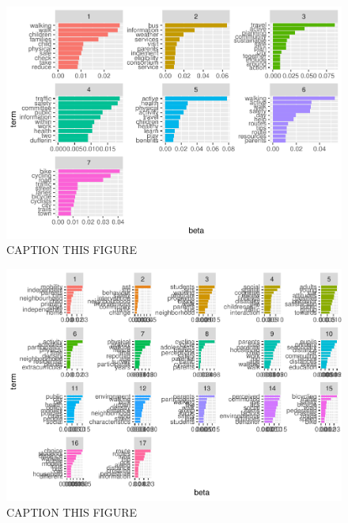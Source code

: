 \documentclass[]{elsarticle} %
\begin{document}
\begin{figure}
\includegraphics[width=1\linewidth]{AST-Framing-Ontario_files/figure-latex/policy-terms-1} \caption{\label{fig:policy-terms}CAPTION THIS FIGURE}\label{fig:policy-terms}
\end{figure}

\begin{figure}
\includegraphics[width=1\linewidth]{AST-Framing-Ontario_files/figure-latex/academic-terms-1} \caption{\label{fig:academic-terms}CAPTION THIS FIGURE}\label{fig:academic-terms}
\end{figure}
\end{document}
